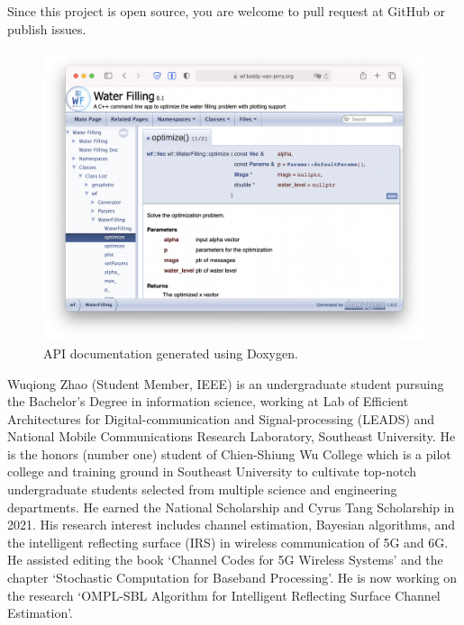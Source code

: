 \documentclass[journal,twoside]{IEEEtran}
\begin{document}
    Since this project is open source, you are welcome to pull request at GitHub or publish issues.

    \begin{figure}[htbp]
      \centering
      \includegraphics[width=\linewidth]{fig/doxygen.png}
      \vspace{-8mm}
      \caption{API documentation generated using Doxygen.}
      \label{fig:doxygen}
    \end{figure}

  \appendices

  

  
  
  \vspace{-0.5cm}
  \begin{IEEEbiography}%
    {Wuqiong Zhao} (Student Member, IEEE)
    is an undergraduate student pursuing the Bachelor's Degree in information science, working at Lab of Efficient Architectures for Digital-communication and Signal-processing (LEADS) and National Mobile Communications Research Laboratory, Southeast University.
    He is the honors (number one) student of Chien-Shiung Wu College which is a pilot college and training ground in Southeast University to cultivate top-notch undergraduate students selected from multiple science and engineering departments.
    He earned the National Scholarship and Cyrus Tang Scholarship in 2021.
    His research interest includes channel estimation, Bayesian algorithms, and the intelligent reflecting surface (IRS) in wireless communication of 5G and 6G.
    He assisted editing the book `Channel Codes for 5G Wireless Systems' and the chapter `Stochastic Computation for Baseband Processing'.
    He is now working on the research `OMPL-SBL Algorithm for Intelligent Reflecting Surface Channel Estimation'.
  \end{IEEEbiography}
\end{document}
